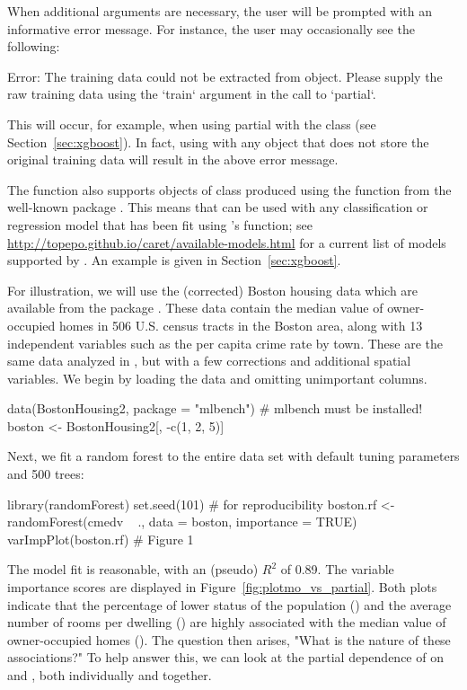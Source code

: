 When additional arguments are necessary, the user will be prompted with an informative error message. For instance, the user may occasionally see the following:
\begin{example}
Error: The training data could not be extracted from object. Please supply
the raw training data using the `train` argument in the call to `partial`.
\end{example}
This will occur, for example, when using partial with the  class (see Section~\ref{sec:xgboost}). In fact, using  with any object that does not store the original training data will result in the above error message.

The  function also supports objects of class  produced using the  function from the well-known  package \citep{caret-pkg}. This means that  can be used with any classification or regression model that has been fit using 's  function; see \url{http://topepo.github.io/caret/available-models.html} for a current list of models supported by . An example is given in Section~\ref{sec:xgboost}.

For illustration, we will use the (corrected) Boston housing data which are available from the  package \citep{mlbench-pkg}. These data contain the median value of owner-occupied homes in 506 U.S. census tracts in the Boston area, along with 13 independent variables such as the per capita crime rate by town. These are the same data analyzed in \citet{harrison-1978-hedonic}, but with a few corrections and additional spatial variables. We begin by loading the data and omitting unimportant columns.
\begin{example}
data(BostonHousing2, package = "mlbench")  # mlbench must be installed!
boston <- BostonHousing2[, -c(1, 2, 5)]
\end{example}
Next, we fit a random forest to the entire data set with default tuning parameters and 500 trees:
\begin{example}
library(randomForest)
set.seed(101)  # for reproducibility
boston.rf <- randomForest(cmedv ~ ., data = boston, importance = TRUE)
varImpPlot(boston.rf)  # Figure 1
\end{example}
The model fit is reasonable, with an  (pseudo) $R^2$ of 0.89. The variable importance scores are displayed in Figure~\ref{fig:plotmo_vs_partial}. Both plots indicate that the percentage of lower status of the population () and the average number of rooms per dwelling () are highly associated with the median value of owner-occupied homes (). The question then arises, "What is the nature of these associations?" To help answer this, we can look at the partial dependence of  on  and , both individually and together.

